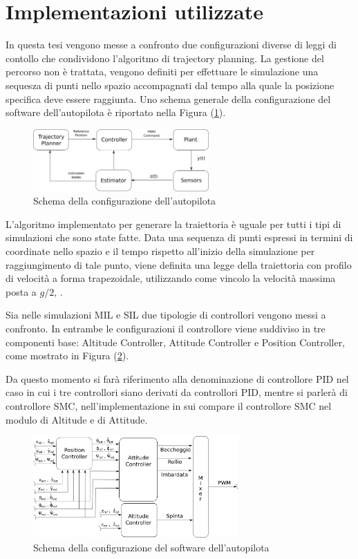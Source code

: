 \section{Implementazioni utilizzate}
In questa tesi vengono messe a confronto due configurazioni diverse di leggi di contollo che condividono l'algoritmo di trajectory planning. La gestione del percorso non è trattata, vengono definiti per effettuare le simulazione una sequesza di punti nello spazio accompagnati dal tempo alla quale la posizione specifica deve essere raggiunta.
Uno schema generale della configurazione del software dell'autopilota è riportato nella Figura (\ref{fig:Autopilota}).


\begin{figure}
	\centering
	\includegraphics[width=0.6\textwidth]{SistemaQuadrirotore/Figure/Autopilota}
	\caption{Schema della configurazione dell'autopilota}
	\label{fig:Autopilota}
\end{figure}

L'algoritmo implementato per generare la traiettoria è uguale per tutti i tipi di simulazioni che sono state fatte. Data una sequenza di punti espressi in termini di coordinate nello spazio e il tempo rispetto all'inizio della simulazione per raggiungimento di tale punto, viene definita una legge della traiettoria con profilo di velocità a forma trapezoidale, utilizzando come vincolo la velocità massima posta a $g/2$, \cite{DesTestCarm}.

Sia nelle simulazioni MIL e SIL due tipologie di controllori vengono messi a confronto. In entrambe le configurazioni il controllore viene suddiviso in tre componenti base: Altitude Controller, Attitude Controller e Position Controller, come mostrato in Figura (\ref{fig:Controller}).

Da questo momento si farà riferimento alla denominazione di controllore PID nel caso in cui i tre controllori siano derivati da controllori PID, mentre si parlerà di controllore SMC, nell'implementazione in sui compare il controllore SMC nel modulo di Altitude e di Attitude.

\begin{figure}
	\centering
	\includegraphics[width=0.7\textwidth]{SistemaQuadrirotore/Figure/Controllore}
	\caption{Schema della configurazione del software dell'autopilota}
	\label{fig:Controller}
\end{figure}

